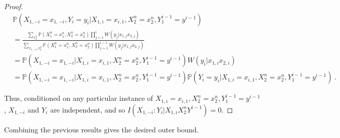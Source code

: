 \documentclass[11pt]{article}
\theoremstyle{definition}
\theoremstyle{remark}
\begin{document}
\begin{proof}
        \begin{equation}
          \begin{aligned}
            &\mathbb{P}\left(X_{1,-i}=x_{1,-i},Y_i=y_i|X_{1,i}=x_{i,1}, X_2^n=x_2^n, Y_1^{i-1}=y^{i-1}\right)\\
            &= \frac{\sum_{x_2^n}\mathbb{P}\left(X_1^n=x_1^n,X_2^n=x_2^n\right)\prod_{j=1}^{i} W(y_j|x_{1,j}x_{2,j})}{\sum_{x_{1,-i},x_2^n}\mathbb{P}\left(X_1^n=x_1^n,X_2^n=x_2^n\right)\prod_{j=1}^{i-1} W(y_j|x_{1,j}x_{2,j})} \\
            &= \mathbb{P}\left(X_{1,-i}=x_{1,-i}|X_{1,i}=x_{i,1}, X_2^n=x_2^n, Y_1^{i-1}=y^{i-1}\right) W(y_i|x_{1,i}x_{2,i})\\
            &= \mathbb{P}\left(X_{1,-i}=x_{1,-i}|X_{1,i}=x_{i,1}, X_2^n=x_2^n, Y_1^{i-1}=y^{i-1}\right) \mathbb{P}\left(Y_i=y_i|X_{1,i}=x_{i,1}, X_2^n=x_2^n, Y_1^{i-1}=y^{i-1}\right) \ .
          \end{aligned}
        \end{equation}

        Thus, conditioned on any particular instance of $X_{1,i}=x_{i,1}, X_2^n=x_2^n, Y_1^{i-1}=y^{i-1}$, $X_{1,-i}$ and $Y_i$ are independent, and so $I(X_{1,-i}:Y_i|X_{1,i}X_2^nY^{i-1}) = 0$.
      \end{proof}

	Combining the previous results gives the desired outer bound.
\end{document}
